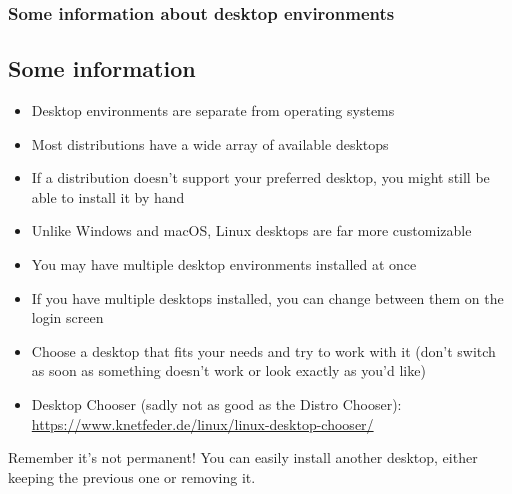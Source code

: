 \begin{frame}
	\frametitle{Some information about desktop environments}
	\subsection{Some information}
	
	\begin{itemize}
		\item Desktop environments are separate from operating systems
		\item Most distributions have a wide array of available desktops
		\item If a distribution doesn't support your preferred desktop, you might still be able to install it by hand
		\item Unlike Windows and macOS, Linux desktops are far more customizable
		\item You may have multiple desktop environments installed at once
		\item If you have multiple desktops installed, you can change between them on the login screen
		\item Choose a desktop that fits your needs and try to work with it (don't switch as soon as something doesn't work or look exactly as you'd like)
		\item Desktop Chooser\cite{desktopchooser} (sadly not as good as the Distro Chooser): \url{https://www.knetfeder.de/linux/linux-desktop-chooser/}
	\end{itemize}

	\hfill

	\begin{alertblock}{Remember it's not permanent!}
		You can easily install another desktop, either keeping the previous one or removing it.
	\end{alertblock}
\end{frame}
